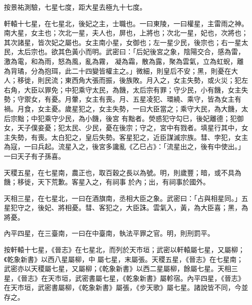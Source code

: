 \begin{pinyinscope}
 按景祐測驗，七星七度，距大星去極九十七度。



 軒轅十七星，在七星北，後妃之主，士職也。一曰東陵，一曰權星，主雷雨之神。南大星，女主也；次北一星，夫人也，屏也，上將也；次北一星，妃也，次將也；其次諸星，皆次妃之屬也。女主南小星，女御也；左一星少民，後宗也；右一星太民，太后宗也。欲其色黃小而明。武密曰：「后妃後宮之象，陰陽交合，感為雷，激為電，和為雨，怒為風，亂為霧，
 凝為霜，散為露，聚為雲氣，立為虹蜺，離為背璚，分為抱珥，此二十四變皆權主之。」微細，則皇后不安；黑，則憂在大人；移徙，則民流；東西角大張而振，後族敗。月入之，女主失勢，或火災；犯左右角，大臣以罪免；中犯乘守太民，為饑，太后宗有罪；守少民，小有饑，女主失勢；守禦女，有憂。月暈，女主有喪。月、五星凌犯、環繞、乘守，皆為女主有禍。月食，女主憂。歲星犯之，女主失勢，一曰大臣當之；乘守大民，為大饑，太后宗黜；中犯乘守少民，為小饑，後宮
 有黜者。熒惑犯守勾巳，後妃離德；犯御女，天子僕妾憂；犯太民、少民，憂在後宗；守之，宮中有戮者。填星行其中，女主失勢，有喪。太白犯之，皇后失勢。客星犯之，近臣謀滅宗族。彗、孛犯，女主為寇，一曰兵起。流星入之，後宮多讒亂《乙巳占》：「流星出之，後有中使出。」一曰天子有子孫喜。



 天稷五星，在七星南，農正也，取百穀之長以為號。明，則歲豐；暗，或不具為饑；移徙，天下荒歉。客星入之，有祠事
 於內；出，有祠事於國外。



 天相三星，在七星北，一曰在酒旗南，丞相大臣之象。武密曰：「占與相星同。」五星犯守之，後妃、將相憂。彗、客犯之，大臣誅。雲氣入，黃，為大臣喜；黑，為將憂。



 內平四星，在三臺南，一曰在中臺南，執法平罪之官。明，則刑罰平。



 按軒轅十七星，《晉志》在七星北，而列於天市垣；武密以軒轅屬七星，又屬柳；《乾象新書》以西八星屬柳，中
 屬七星，末屬張。天稷五星，《晉志》在七星南；武密亦以天稷屬七星，又屬柳；《乾象新書》以西二星屬柳，餘屬七星。天相三星，《晉志》在天市垣，武密書屬七星，《乾象新書》屬軫宿。內平四星，《晉志》在天市垣，武密書屬柳，《乾象新書》屬張，《步天歌》屬七星。諸說皆不同，今並存之。




\end{pinyinscope}
